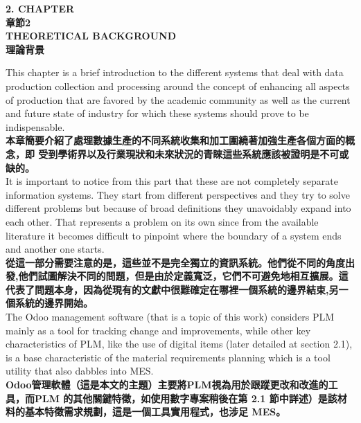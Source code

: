 \documentclass[24pt]{article} %
\begin{document}
 \begin{center}
\Large \textbf{2. CHAPTER}\\

\Large \textbf{章節2}\\

\Large \textbf{THEORETICAL BACKGROUND}\\

\Large \textbf{理論背景}\\
 \end{center}
This chapter is a brief introduction to the different systems that deal with data production collection and processing around the concept of enhancing all aspects of production that are favored by the academic community as well as the current and future state of industry for which these systems should prove to be indispensable.\\

\textbf{本章簡要介紹了處理數據生產的不同系統收集和加工圍繞著加強生產各個方面的概念，即 受到學術界以及行業現狀和未來狀況的青睞這些系統應該被證明是不可或缺的。}\\

It is important to notice from this part that these are not completely separate information systems. They start from different perspectives and they try to solve different problems but because of broad definitions they unavoidably expand into each other. That represents a problem on its own since from the available literature it becomes difficult to pinpoint where the boundary of a system ends and another one starts.\\

 \textbf{從這一部分需要注意的是，這些並不是完全獨立的資訊系統。他們從不同的角度出發,他們試圖解決不同的問題，但是由於定義寬泛，它們不可避免地相互擴展。這代表了問題本身，因為從現有的文獻中很難確定在哪裡一個系統的邊界結束,另一個系統的邊界開始。}\\

The Odoo management software (that is a topic of this work) considers PLM mainly as a tool for tracking change and improvements, while other key characteristics of PLM, like the use of digital items (later detailed at section 2.1), is a base characteristic of the material requirements planning which is a tool utility that also dabbles into MES.\\

\textbf{Odoo管理軟體（這是本文的主題）主要將PLM視為用於跟蹤更改和改進的工具，而PLM 的其他關鍵特徵，如使用數字專案稍後在第 2.1 節中詳述）是該材料的基本特徵需求規劃，這是一個工具實用程式，也涉足 MES。}\\
\end{document}

